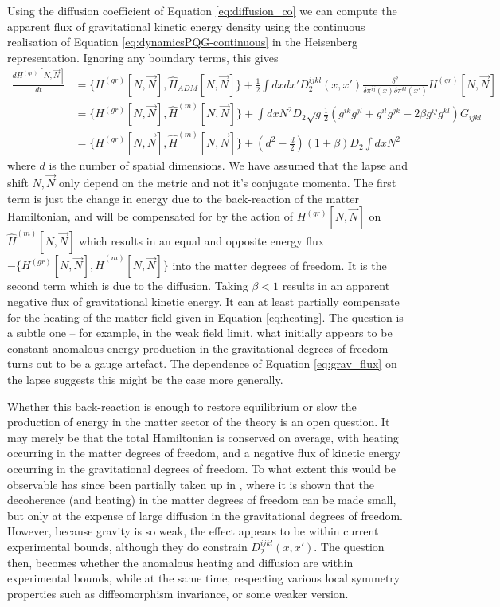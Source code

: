 \documentclass[aps,pra,showpacs,citeautoscript,amsmath,amssymb,floatfix,superscriptaddress,bbm, verbatim,amsfonts,changes,12pt,nofootinbib,longbibliography]{revtex4-2}
\def\Hq{\hat{H}}
\def\gravham{H^{(gr)}}
\def\qmatterham{\hat{H}^{(m)}}
\def\lapsh{[N,\vec{N}]}
\def\cqadm{{\Hq_{ADM}}}
\begin{document}
Using the diffusion coefficient of Equation \eqref{eq:diffusion_co} we can compute the apparent flux of gravitational kinetic energy density using the continuous realisation of Equation \eqref{eq:dynamicsPQG-continuous}  
in the Heisenberg representation. Ignoring any boundary terms, this gives
\begin{align}
\frac{d\gravham\lapsh}{dt}&=\{\gravham\lapsh,\cqadm\lapsh\}
+\frac{1}{2}\int dx dx' D_2^{ijkl}(x,x')\frac{\delta^2}{\delta\pi^{ij}(x)\delta\pi^{kl}(x')}\gravham\lapsh
\nonumber\\
&=\{\gravham\lapsh,\qmatterham\lapsh\}+\int dx N^2 D_2 \sqrt{g}
\frac{1}{2}\left(g^{ik}g^{jl}+g^{il}g^{jk}-2\beta g^{ij}g^{kl}\right)G_{ijkl}
\nonumber\\
&=\{\gravham\lapsh,\qmatterham\lapsh\}
+(d^2-\frac{d}{2})(1+\beta) D_2\int dx N^2\label{eq:grav_flux}
\end{align}
where $d$ is the number of spatial dimensions. We have assumed that the lapse and shift $N,\vec{N}$ only depend on the metric and not it's conjugate momenta. The first term
 is just the change in energy due to the back-reaction of the matter Hamiltonian, and will be compensated for by the action of $\gravham\lapsh$ on $\qmatterham\lapsh$
which results in an equal and opposite energy flux
 $-\{\gravham\lapsh,\qmatterham\lapsh\}$ into the matter degrees of freedom.  It is the second term which is due to the diffusion. Taking $\beta<1$ results in an apparent negative flux of gravitational kinetic energy. It can at least partially compensate for the heating of the matter field given in Equation \eqref{eq:heating}.
The question is a subtle one -- for example, in the weak field limit, what initially appears to be constant anomalous energy production in the gravitational degrees of freedom turns out to be a gauge artefact\cite{layton2023weak}. The dependence of Equation \eqref{eq:grav_flux} on the lapse suggests this might be the case more generally.
	
Whether this back-reaction is enough to restore equilibrium or slow the production of energy in the matter sector of the theory is an open question. It may merely be that the total Hamiltonian is conserved on average, with heating occurring in the matter degrees of freedom, and a negative flux of kinetic energy occurring in the gravitational degrees of freedom.
To what extent this would be observable has since been partially taken up in \cite{oppenheim2021gravitationally}, where it is shown that the decoherence (and heating) in the matter degrees of freedom can be made small, but only at the expense of large diffusion in the gravitational degrees of freedom. However, because gravity is so weak, the effect appears to be within current experimental bounds, although they do constrain $D_2^{ijkl}(x,x')$. %
The question then, becomes whether the anomalous heating and diffusion are within experimental bounds, while at the same time, respecting various local symmetry properties such as diffeomorphism invariance, or some weaker version. 
\end{document}
